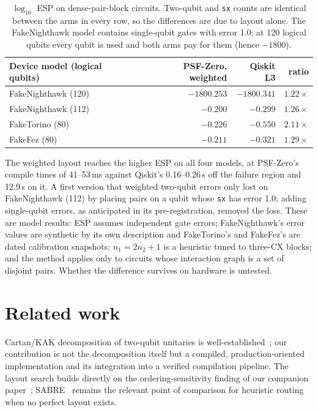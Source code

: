\documentclass[11pt]{article}
\begin{document}
\begin{table}[h]
\centering
\begin{tabular}{lrrr}
\toprule
Device model (logical qubits) & PSF-Zero, weighted & Qiskit L3 & ratio \\
\midrule
FakeNighthawk (120) & $-1800.253$ & $-1800.341$ & $1.22\times$ \\
FakeNighthawk (112) & $-0.200$ & $-0.299$ & $1.26\times$ \\
FakeTorino (80) & $-0.226$ & $-0.550$ & $2.11\times$ \\
FakeFez (80) & $-0.211$ & $-0.321$ & $1.29\times$ \\
\bottomrule
\end{tabular}
\caption{$\log_{10}$ ESP on dense-pair-block circuits. Two-qubit and
\texttt{sx} counts are identical between the arms in every row, so the
differences are due to layout alone. The FakeNighthawk model contains
single-qubit gates with error 1.0; at 120 logical qubits every qubit is
used and both arms pay for them (hence $-1800$).}
\label{tab:esp}
\end{table}

The weighted layout reaches the higher ESP on all four models, at
PSF-Zero's compile times of 41--53\,ms against Qiskit's 0.16--0.26\,s off
the failure region and 12.9\,s on it. A first version that weighted
two-qubit errors only lost on FakeNighthawk (112) by placing pairs on a
qubit whose \texttt{sx} has error 1.0; adding single-qubit errors, as
anticipated in its pre-registration, removed the loss. These are model
results: ESP assumes independent gate errors; FakeNighthawk's error
values are synthetic by its own description and FakeTorino's and
FakeFez's are dated calibration snapshots; $n_1 = 2n_2+1$ is a heuristic
tuned to three-CX blocks; and the method applies only to circuits whose
interaction graph is a set of disjoint pairs. Whether the difference
survives on hardware is untested.

\section{Related work}

Cartan/KAK decomposition of two-qubit unitaries is
well-established~\cite{kak1,kak2}; our contribution is not the
decomposition itself but a compiled, production-oriented
implementation and its integration into a verified compilation
pipeline. The layout search builds directly on the ordering-sensitivity
finding of our companion paper~\cite{vf2cliff}; SABRE~\cite{sabre}
remains the relevant point of comparison for heuristic routing when no
perfect layout exists.
\end{document}
